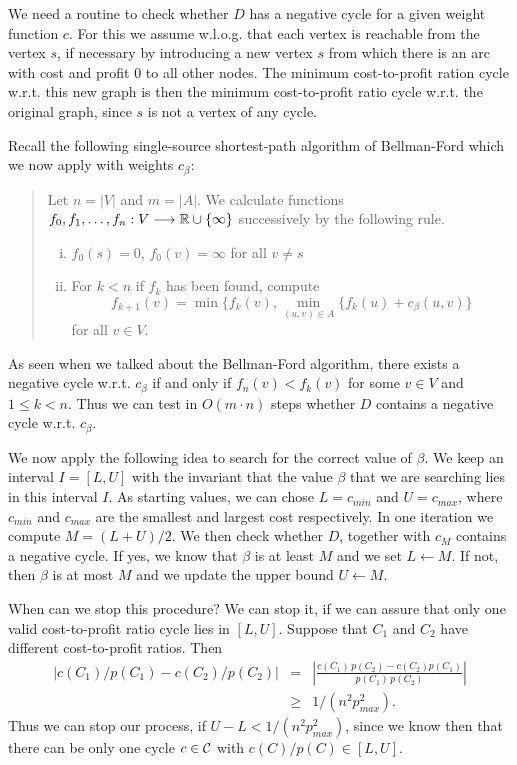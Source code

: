 We need a routine to check whether $D$ has a negative cycle for a
given weight function $c$. For this we assume w.l.o.g. that each 
vertex is reachable from the vertex $s$, if necessary by introducing a
new vertex $s$ from which there is an arc with cost and profit $0$ to
all other nodes. The minimum cost-to-profit ration cycle w.r.t. this
new graph is then the minimum cost-to-profit ratio cycle w.r.t. the
original graph, since $s$ is not a vertex of any cycle. 

Recall the following single-source shortest-path algorithm  of
Bellman-Ford which we now apply with weights $c_\beta$: 


{\small
  \begin{quote}
    Let $n=|V|$ and $m=|A|$. We calculate functions 
    $f_0,f_1,\ldots,f_n:V\longrightarrow\mathbb{R}\cup\{\infty\}$
    successively by the following rule. 
    
    \begin{enumerate}[i)]
    \item $f_0(s) = 0$, $f_0(v) = \infty$ for all $v \neq s$ 
    \item For $k<n$ if $f_k$ has been found, compute 
      \begin{displaymath}
        \displaystyle f_{k+1}(v) = \min\{f_k(v), \min_{(u,v)\in A}\{f_k(u)+c_\beta(u,v)\}  
      \end{displaymath}
      for all $v \in V$. 
    \end{enumerate}
  \end{quote}
}

As seen when we talked about the Bellman-Ford algorithm, there 
exists a negative cycle w.r.t. $c_\beta$ if and only if 
$f_n(v) <f_k(v)$  for some $v \in V$ and $1\leq k<n$. Thus we can 
test in $O(m\cdot n)$ steps whether $D$ contains a 
negative cycle w.r.t. $c_\beta$. 

We now apply the following idea to  search for the correct value of
$\beta$. We keep an interval $I = [L,U]$ with the invariant that the
value  $\beta$ that we are searching lies in this interval $I$. As
starting values, we can chose $L = c_{min}$ and $U = c_{max}$, 
where $c_{min}$ and $c_{max}$ are the smallest and largest cost
respectively. In one iteration we compute $M = (L + U) /2$. We then
check whether $D$, together with $c_M$ contains a negative cycle. If
yes, we know that $\beta$ is at least $M$ and we set $L\gets M$. If not, then
$\beta$ is at most $M$ and we update the upper bound $U \gets M$. 

When can we stop this procedure? We can stop it, if we can assure that
only one valid cost-to-profit ratio cycle  lies in $[L,U]$. Suppose that $C_1$
and $C_2$ have different cost-to-profit ratios. Then 
\begin{eqnarray}
 | c(C_1) /  p(C_1) - c(C_2)/ p(C_2) | & = & \left| \frac{c(C_1)\, p(C_2) -
 c(C_2)p(C_1)}{  p(C_1) \, p(C_2)}\right| \\
                                & \geq & 1/ (n^2 p_{max}^2). 
\end{eqnarray}
%
Thus we can stop our process, if $U-L< 1/ (n^2 p_{max}^2)$, since we
know then that there can be only one cycle $c \in \mathcal{C}$ with
$c(C)/p(C) \in [L,U]$.

